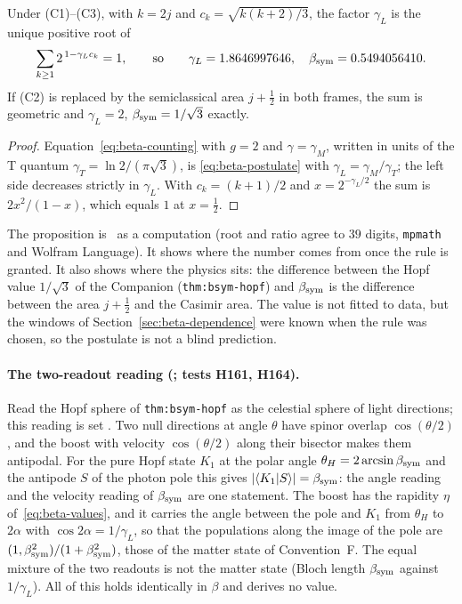 \begin{proposition}
\label{prop:beta-postulate}
Under (C1)--(C3), with $k=2j$ and $c_k=\sqrt{k(k+2)/3}$, the factor $\gamma_L$ is the unique positive root of
\begin{equation}
 \sum_{k\ge1}2^{\,1-\gamma_Lc_k}=1,\qquad\text{so}\qquad \gamma_L=1.8646997646,\quad \beta_{\mathrm{sym}}=0.5494056410 .
 \label{eq:beta-postulate}
\end{equation}
If (C2) is replaced by the semiclassical area $j+\tfrac12$ in both frames, the sum is geometric and $\gamma_L=2$, $\beta_{\mathrm{sym}}=1/\sqrt3$ exactly.
\end{proposition}

\begin{proof}
Equation~\eqref{eq:beta-counting} with $g=2$ and $\gamma=\gamma_M$, written in units of the T quantum $\gamma_T=\ln2/(\pi\sqrt3)$, is
\eqref{eq:beta-postulate} with $\gamma_L=\gamma_M/\gamma_T$; the left side decreases strictly in $\gamma_L$.  With $c_k=(k+1)/2$ and
$x=2^{-\gamma_L/2}$ the sum is $2x^2/(1-x)$, which equals $1$ at $x=\tfrac12$.
\end{proof}

The proposition is \Established\ as a computation (root and ratio agree to $39$ digits, \texttt{mpmath} and Wolfram Language).  It shows where the
number comes from once the rule is granted.  It also shows where the physics sits: the difference between the Hopf value $1/\sqrt3$ of the
Companion (\texttt{thm:bsym-hopf}) and $\beta_{\mathrm{sym}}$ is the difference between the area $j+\tfrac12$ and the Casimir area.  The value is not
fitted to data, but the windows of Section~\ref{sec:beta-dependence} were known when the rule was chosen, so the postulate is not a blind
prediction.

\paragraph{The two-readout reading (; tests H161, H164).}  Read the Hopf sphere of \texttt{thm:bsym-hopf} as the celestial sphere of light
directions; this reading is set \Reading.  Two null directions at angle $\theta$ have spinor overlap $\cos(\theta/2)$, and the boost with velocity
$\cos(\theta/2)$ along their bisector makes them antipodal.  For the pure Hopf state $K_1$ at the polar angle $\theta_H=2\arcsin\beta_{\mathrm{sym}}$ and the
antipode $S$ of the photon pole this gives $|\langle K_1|S\rangle|=\beta_{\mathrm{sym}}$: the angle reading and the velocity reading of $\beta_{\mathrm{sym}}$ are one statement.
The boost has the rapidity $\eta$ of~\eqref{eq:beta-values}, and it carries the angle between the pole and $K_1$ from $\theta_H$ to $2\alpha$ with
$\cos2\alpha=1/\gamma_L$, so that the populations along the image of the pole are $(1,\beta_{\mathrm{sym}}^2)/(1+\beta_{\mathrm{sym}}^2)$, those of the matter state of Convention~F.
The equal mixture of the two readouts is not the matter state (Bloch length $\beta_{\mathrm{sym}}$ against $1/\gamma_L$).  All of this holds identically in
$\beta$ and derives no value.

